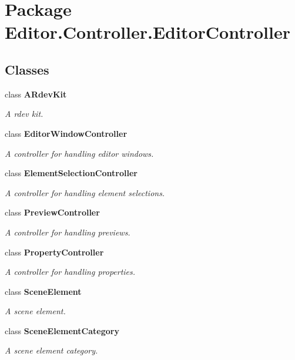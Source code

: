 \section{Package Editor.\-Controller.\-Editor\-Controller}
\label{namespace_editor_1_1_controller_1_1_editor_controller}
\subsection*{Classes}
\begin{DoxyCompactItemize}
\item 
class {\bf A\-Rdev\-Kit}
\begin{DoxyCompactList}\small\item\em A rdev kit. \end{DoxyCompactList}\item 
class {\bf Editor\-Window\-Controller}
\begin{DoxyCompactList}\small\item\em A controller for handling editor windows. \end{DoxyCompactList}\item 
class {\bf Element\-Selection\-Controller}
\begin{DoxyCompactList}\small\item\em A controller for handling element selections. \end{DoxyCompactList}\item 
class {\bf Preview\-Controller}
\begin{DoxyCompactList}\small\item\em A controller for handling previews. \end{DoxyCompactList}\item 
class {\bf Property\-Controller}
\begin{DoxyCompactList}\small\item\em A controller for handling properties. \end{DoxyCompactList}\item 
class {\bf Scene\-Element}
\begin{DoxyCompactList}\small\item\em A scene element. \end{DoxyCompactList}\item 
class {\bf Scene\-Element\-Category}
\begin{DoxyCompactList}\small\item\em A scene element category. \end{DoxyCompactList}\end{DoxyCompactItemize}
